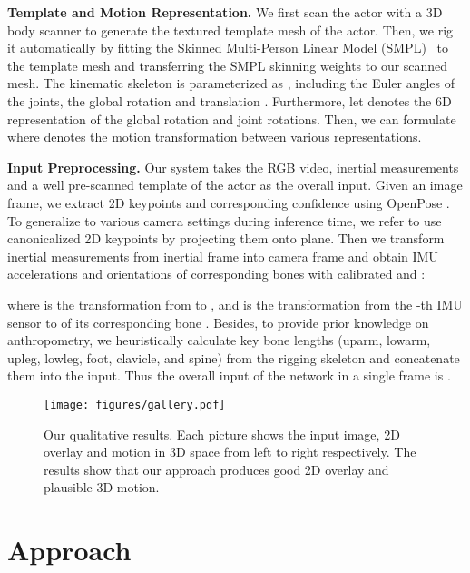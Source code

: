 \documentclass[letterpaper]{article} \usepackage{aaai23}  \usepackage{times}  \usepackage{helvet}  \usepackage{courier}  \usepackage[hyphens]{url}  \usepackage{graphicx} \urlstyle{rm} \def\UrlFont{\rm}  \usepackage{natbib}  \usepackage{caption} \frenchspacing  \setlength{\pdfpagewidth}{8.5in}  \setlength{\pdfpageheight}{11in}  \usepackage{algorithm}
\newcommand{\myparagraph}[1]{\vspace{0.1em}\noindent\textbf{#1}}
\begin{document}
\myparagraph{Template and Motion Representation.}
We first scan the actor with a 3D body scanner to generate the textured template mesh of the actor. Then, we rig it automatically by fitting the Skinned Multi-Person Linear Model (SMPL)~\cite{SMPL2015} to the template mesh and transferring the SMPL skinning weights to our scanned mesh.
The kinematic skeleton is parameterized as , including the Euler angles  of the  joints, the global rotation  and translation . 
Furthermore, let  denotes the 6D representation \cite{zhou2019continuity} of the global rotation and joint rotations.
Then, we can formulate  where  denotes the motion transformation between various representations.

\myparagraph{Input Preprocessing.}
Our system takes the RGB video, inertial measurements and a well pre-scanned template of the actor as the overall input.
Given an image frame, we extract  2D keypoints  and corresponding confidence  using OpenPose \cite{OpenPose}. To generalize to various camera settings during inference time, we refer \cite{PhysAwareTOG2021} to use canonicalized 2D keypoints  by projecting them onto  plane. Then we transform inertial measurements from inertial frame  into camera frame  and obtain IMU accelerations  and orientations  of  corresponding bones  with calibrated  and :
 
where  is the transformation from  to , and  is the transformation from the -th IMU sensor  to  of its corresponding bone .
Besides, to provide prior knowledge on anthropometry, we heuristically calculate  key bone lengths  (uparm, lowarm, upleg, lowleg, foot, clavicle, and spine) from the rigging skeleton  and concatenate them into the input. Thus the overall input of the network in a single frame is .






 \begin{figure*}[th]
	\centering
	\texttt{[image: figures/gallery.pdf]}
	\caption{Our qualitative results. Each picture shows the input image, 2D overlay and motion in 3D space from left to right respectively. The results show that our approach produces good 2D overlay and plausible 3D motion.}
	\label{fig:gallery}
	\vspace{-1mm}
\end{figure*}

\section{Approach}
\end{document}
